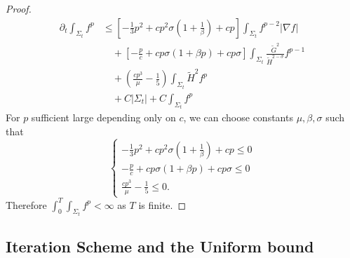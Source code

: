 \begin{proof}
    \begin{equation}
    \begin{split}
        \partial _t \int_{\Sigma_t} f^p 
    &\leq \left[ -\frac{1}{3}p^2+cp^2 \sigma (1+\frac{1}{\beta })+cp \right] \int_{\Sigma_t} f_{}^{p-2} \left| \nabla f \right|   \\
    &\quad + \left[ -\frac{p}{c}+cp \sigma (1+\beta p)+cp \sigma  \right] \int_{\Sigma_t} \frac{\tilde{G}^2}{\tilde{H}^{2-\sigma }}f^{p-1}\\
    &\quad + \left( \frac{cp^3}{\mu }-\frac{1}{5} \right) \int_{\Sigma_t} \tilde{H}^2f^{p}\\
    &\quad + C \left| \Sigma _t \right| + C \int_{\Sigma_t} f^p
    \end{split}
    \end{equation} 
    For $p$ sufficient large depending only on $c$, we can choose constants $\mu , \beta , \sigma $ such that
    \[
    \begin{cases}
        -\frac{1}{3}p^2+cp^2 \sigma (1+\frac{1}{\beta })+cp \leq 0\\
        -\frac{p}{c}+cp \sigma (1+\beta p)+cp \sigma \leq 0\\
        \frac{cp^3}{\mu }-\frac{1}{5} \leq 0.
    \end{cases}
    \]
    Therefore $\int_{0}^{T}\int_{\Sigma_t} f^p<\infty$ as $T$ is finite.
\end{proof}

\subsection{Iteration Scheme and the Uniform bound}

